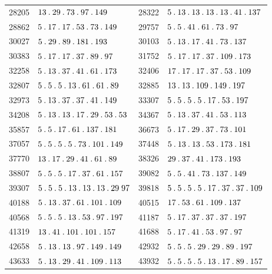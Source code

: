 \begin{longtable}{@{}r|l@{\qquad}r|l@{}}
28205 & $13\pdot 29\pdot 73\pdot 97\pdot 149$ & 28322 & $5\pdot 13\pdot 13\pdot 13\pdot 13\pdot 41\pdot 137$\\
28862 & $5\pdot 17\pdot 17\pdot 53\pdot 73\pdot 149$ & 29757 & $5\pdot 5\pdot 41\pdot 61\pdot 73\pdot 97$\\
30027 & $5\pdot 29\pdot 89\pdot 181\pdot 193$ & 30103 & $5\pdot 13\pdot 17\pdot 41\pdot 73\pdot 137$\\
30383 & $5\pdot 17\pdot 17\pdot 37\pdot 89\pdot 97$ & 31752 & $5\pdot 17\pdot 17\pdot 37\pdot 109\pdot 173$\\
32258 & $5\pdot 13\pdot 37\pdot 41\pdot 61\pdot 173$ & 32406 & $17\pdot 17\pdot 17\pdot 37\pdot 53\pdot 109$\\
32807 & $5\pdot 5\pdot 5\pdot 13\pdot 61\pdot 61\pdot 89$ & 32885 & $13\pdot 13\pdot 109\pdot 149\pdot 197$\\
32973 & $5\pdot 13\pdot 37\pdot 37\pdot 41\pdot 149$ & 33307 & $5\pdot 5\pdot 5\pdot 5\pdot 17\pdot 53\pdot 197$\\
34208 & $5\pdot 13\pdot 13\pdot 17\pdot 29\pdot 53\pdot 53$ & 34367 & $5\pdot 13\pdot 37\pdot 41\pdot 53\pdot 113$\\
35857 & $5\pdot 5\pdot 17\pdot 61\pdot 137\pdot 181$ & 36673 & $5\pdot 17\pdot 29\pdot 37\pdot 73\pdot 101$\\
37057 & $5\pdot 5\pdot 5\pdot 5\pdot 73\pdot 101\pdot 149$ & 37448 & $5\pdot 13\pdot 13\pdot 53\pdot 173\pdot 181$\\
37770 & $13\pdot 17\pdot 29\pdot 41\pdot 61\pdot 89$ & 38326 & $29\pdot 37\pdot 41\pdot 173\pdot 193$\\
38807 & $5\pdot 5\pdot 5\pdot 17\pdot 37\pdot 61\pdot 157$ & 39082 & $5\pdot 5\pdot 41\pdot 73\pdot 137\pdot 149$\\
39307 & $5\pdot 5\pdot 5\pdot 13\pdot 13\pdot 13\pdot 29\;97$ & 39818 & $5\pdot 5\pdot 5\pdot 5\pdot 17\pdot 37\pdot 37\pdot 109$\\
40188 & $5\pdot 13\pdot 37\pdot 61\pdot 101\pdot 109$ & 40515 & $17\pdot 53\pdot 61\pdot 109\pdot 137$\\
40568 & $5\pdot 5\pdot 5\pdot 13\pdot 53\pdot 97\pdot 197$ & 41187 & $5\pdot 17\pdot 37\pdot 37\pdot 37\pdot 197$\\
41319 & $13\pdot 41\pdot 101\pdot 101\pdot 157$ & 41688 & $5\pdot 17\pdot 41\pdot 53\pdot 97\pdot 97$\\
42658 & $5\pdot 13\pdot 13\pdot 97\pdot 149\pdot 149$ & 42932 & $5\pdot 5\pdot 5\pdot 29\pdot 29\pdot 89\pdot 197$\\
43633 & $5\pdot 13\pdot 29\pdot 41\pdot 109\pdot 113$ & 43932 & $5\pdot 5\pdot 5\pdot 5\pdot 13\pdot 17\pdot 89\pdot 157$\\

\end{longtable}
